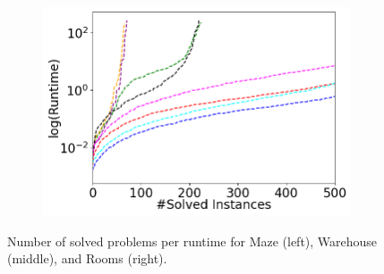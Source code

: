 \documentclass[letterpaper]{article} %
\def\
UrlFont{\rm}  %
\theoremstyle{definition}
\begin{document}
{\begin{figure}[tbhp]
\begin{subfigure}[b]{0.69\columnwidth}
    \end{subfigure}
    \begin{subfigure}[b]{0.69\columnwidth}\centering  
      \includegraphics[width=\columnwidth]{Figures/room/mixed_small_figures/Cactus.png}
    \end{subfigure}
    \caption{Number of solved problems per runtime for Maze (left), Warehouse (middle), and Rooms (right).}
    \label{fig:rt-soc-results}
\end{figure}
}
\end{document}
